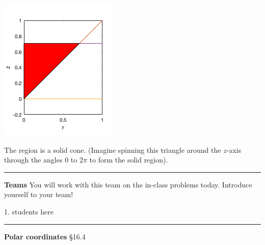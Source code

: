 \documentclass[12pt,letterpaper,noanswers]{exam}
\begin{document}
\includegraphics[scale=0.8]{img/C13skill.png}

The region is a solid cone.  (Imagine spinning this triangle around the $z$-axis through the angles $0$ to $2\pi$ to form the solid region).


\vspace{0.2cm}
\hrule
\vspace{0.2cm}

\eject

\noindent\textbf{Teams}
You will work with this team on the in-class problems today.  Introduce yourself to your team!
\begin{multicols}{2}
1.  students here

\end{multicols}

\hrule
\vspace{0.2cm}

\noindent\textbf{Polar coordinates} \S 16.4
\end{document}
